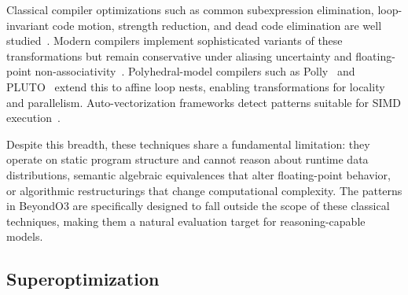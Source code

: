 Classical compiler optimizations such as common subexpression elimination, loop-invariant code motion, strength reduction, and dead code elimination are well studied~\cite{aho2006compilers}. Modern compilers implement sophisticated variants of these transformations but remain conservative under aliasing uncertainty and floating-point non-associativity~\cite{allen2001optimizing}. Polyhedral-model compilers such as Polly~\cite{grosser2012polly} and PLUTO~\cite{bondhugula2008pluto} extend this to affine loop nests, enabling transformations for locality and parallelism. Auto-vectorization frameworks detect patterns suitable for SIMD execution~\cite{nuzman2006auto}.

Despite this breadth, these techniques share a fundamental limitation: they operate on static program structure and cannot reason about runtime data distributions, semantic algebraic equivalences that alter floating-point behavior, or algorithmic restructurings that change computational complexity. The patterns in BeyondO3 are specifically designed to fall outside the scope of these classical techniques, making them a natural evaluation target for reasoning-capable models.

\subsection{Superoptimization}

